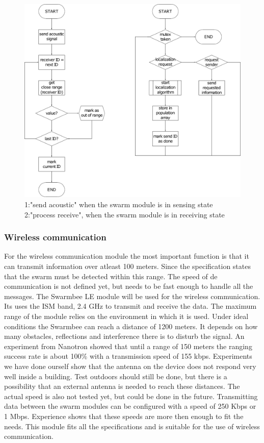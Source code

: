 \documentclass[10pt,a4paper]{article}
\begin{document}
\begin{figure}[H]
   \centering
   \includegraphics[width=\textwidth]{sendre.pdf}
   \caption{1:"send acoustic" when the swarm module is in sensing state 2:"process receive", when the swarm module is in receiving state}
   \label{fig:sendre}
\end{figure}


\subsubsection{Wireless communication}

For the wireless communication module the most important function is that it can transmit information over atleast 100 meters. Since the specification states that the swarm must be detected within this range. The speed of de communication is not defined yet, but needs to be fast enough to handle all the messages. The Swarmbee LE module will be used for the wireless communication. Its uses the ISM band, 2.4 GHz to transmit and receive the data. The maximum range of the module relies on the environment in which it is used. Under ideal conditions the Swarmbee can reach a distance of 1200 meters. It depends on how many obstacles, reflections and interference there is to disturb the signal. An experiment from Nanotron showed that until a range of 150 meters the ranging success rate is about 100\% with a transmission speed of 155 kbps. Experiments we have done ourself show that the antenna on the device does not respond very well inside a building. Test outdoors should still be done, but there is a possibility that an external antenna is needed to reach these distances. The actual speed is also not tested yet, but could be done in the future. Transmitting data between the swarm modules can be configured with a speed of 250 Kbps or 1 Mbps. Experience shows that these speeds are more then enough to fit the needs. This module fits all the specifications and is suitable for the use of wireless communication.
\end{document}
